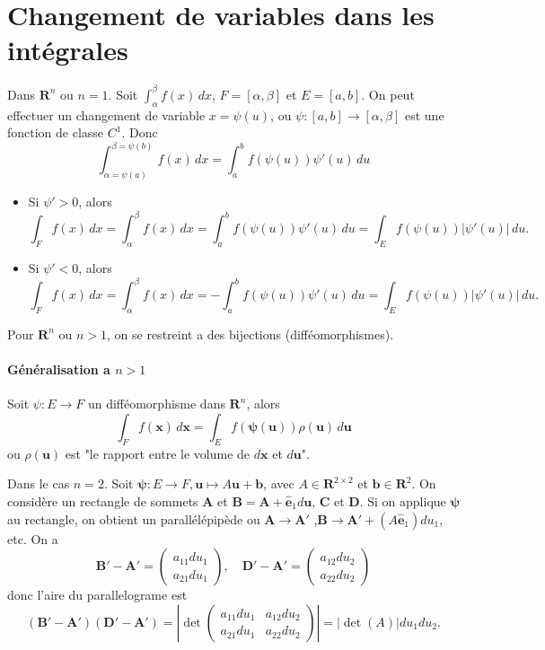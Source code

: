 \section{Changement de variables dans les intégrales}
\begin{reminder}
Dans $\mathbf{R}^{n}$ ou $n=1$. Soit $\int_{\alpha}^{\beta} f(x) \, dx$, $F=[\alpha,\beta]$ et $E=[a,b]$. On peut effectuer un changement de variable $x=\psi(u)$, ou $\psi:[a,b]\to[\alpha,\beta]$ est une fonction de classe $C^{1}$. Donc
$$
	\int_{\alpha=\psi(a)}^{\beta=\psi(b)}f(x)  \, dx=\int_{a}^{b} f(\psi(u))\psi'(u) \, du  
$$
\begin{itemize}
\item Si $\psi'>0$, alors
$$
\int _{F}f(x)\,dx=\int_{\alpha}^{\beta} f(x) \, dx =\int_{a}^{b} f(\psi(u))\psi'(u) \, du= \int _{E}f(\psi(u))|\psi'(u)| \, du. 
$$
\item Si $\psi'<0$, alors
$$
	\int _{F}f(x) \, dx =\int_{\alpha}^{\beta} f(x) \, dx  =-\int_{a}^{b} f(\psi(u))\psi'(u)   \, du=\int _{E}f(\psi(u))|\psi'(u)|\, du.  
$$
\end{itemize}
\end{reminder}
\begin{remark}
Pour $\mathbf{R}^{n}$ ou $n>1$, on se restreint a des bijections (difféomorphismes).
\end{remark}
\paragraph{Généralisation a $n>1$}
Soit $\psi:E\to F$ un difféomorphisme dans $\mathbf{R}^{n}$, alors
$$
\int _{F}f(\boldsymbol{x}) \, d\boldsymbol{x}=\int _{E}f(\boldsymbol{\psi}(\boldsymbol{u}))\rho(\boldsymbol{u}) \, d\boldsymbol{u} 
$$
ou $\rho(\boldsymbol{u})$ est "le rapport entre le volume de $d\boldsymbol{x}$ et $d\boldsymbol{u}$".

Dans le cas $n=2$. Soit $\boldsymbol{\psi}:E\to F,\boldsymbol{u}\mapsto A\boldsymbol{u}+\boldsymbol{b}$, avec $A\in \mathbf{R}^{2\times 2}$ et $\boldsymbol{b}\in \mathbf{R}^{2}$. On considère un rectangle de sommets $\boldsymbol{A}$ et $\boldsymbol{B}=\boldsymbol{A}+\boldsymbol{\hat{e}}_{1}d\boldsymbol{u}$, $\boldsymbol{C}$ et $\boldsymbol{D}$. Si on applique $\boldsymbol{\psi}$ au rectangle, on obtient un parallélépipède ou $\boldsymbol{A}\to \boldsymbol{A}'$ ,$\boldsymbol{B}\to\boldsymbol{A}'+(A\boldsymbol{\hat{e}}_{1})du_{1}$, etc. On a
$$
\boldsymbol{B}'-\boldsymbol{A}'=\begin{pmatrix}
a_{11}du_{1} \\
a_{21}du_{1}
\end{pmatrix},\quad \boldsymbol{D}'-\boldsymbol{A}'=\begin{pmatrix}
a_{12}du_{2} \\
a_{22}du_{2}
\end{pmatrix}
$$
donc l'aire du parallelograme est 
$$
(\boldsymbol{B}'-\boldsymbol{A}')(\boldsymbol{D}'-\boldsymbol{A}')=|\det \begin{pmatrix}
a_{11}du_{1}  & a_{12}du_{2} \\
a_{21}du_{1} & a_{22}du_{2}
\end{pmatrix}|=|\det(A)|du_{1}du_{2}.
$$

